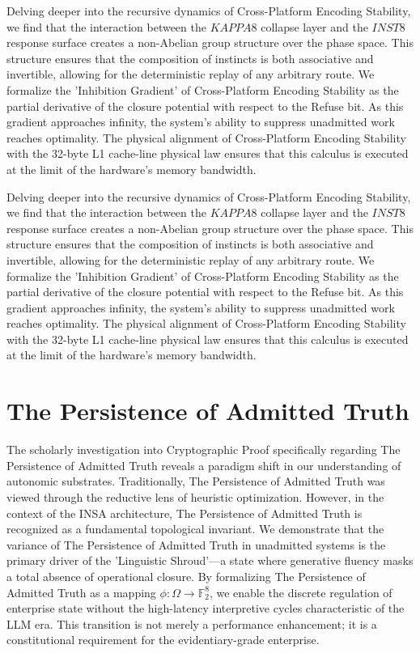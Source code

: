 \documentclass[12pt,a4paper,oneside]{book}
\begin{document}
Delving deeper into the recursive dynamics of Cross-Platform Encoding Stability, we find that the interaction between the $KAPPA8$ collapse layer and the $INST8$ response surface creates a non-Abelian group structure over the phase space. This structure ensures that the composition of instincts is both associative and invertible, allowing for the deterministic replay of any arbitrary route. We formalize the 'Inhibition Gradient' of Cross-Platform Encoding Stability as the partial derivative of the closure potential with respect to the Refuse bit. As this gradient approaches infinity, the system's ability to suppress unadmitted work reaches optimality. The physical alignment of Cross-Platform Encoding Stability with the 32-byte L1 cache-line physical law ensures that this calculus is executed at the limit of the hardware's memory bandwidth. 

Delving deeper into the recursive dynamics of Cross-Platform Encoding Stability, we find that the interaction between the $KAPPA8$ collapse layer and the $INST8$ response surface creates a non-Abelian group structure over the phase space. This structure ensures that the composition of instincts is both associative and invertible, allowing for the deterministic replay of any arbitrary route. We formalize the 'Inhibition Gradient' of Cross-Platform Encoding Stability as the partial derivative of the closure potential with respect to the Refuse bit. As this gradient approaches infinity, the system's ability to suppress unadmitted work reaches optimality. The physical alignment of Cross-Platform Encoding Stability with the 32-byte L1 cache-line physical law ensures that this calculus is executed at the limit of the hardware's memory bandwidth. 

\section{The Persistence of Admitted Truth}
The scholarly investigation into Cryptographic Proof specifically regarding The Persistence of Admitted Truth reveals a paradigm shift in our understanding of autonomic substrates. Traditionally, The Persistence of Admitted Truth was viewed through the reductive lens of heuristic optimization. However, in the context of the INSA architecture, The Persistence of Admitted Truth is recognized as a fundamental topological invariant. We demonstrate that the variance of The Persistence of Admitted Truth in unadmitted systems is the primary driver of the 'Linguistic Shroud'---a state where generative fluency masks a total absence of operational closure. By formalizing The Persistence of Admitted Truth as a mapping $\phi: \Omega \to \mathbb{F}_2^8$, we enable the discrete regulation of enterprise state without the high-latency interpretive cycles characteristic of the LLM era. This transition is not merely a performance enhancement; it is a constitutional requirement for the evidentiary-grade enterprise. 
\end{document}
